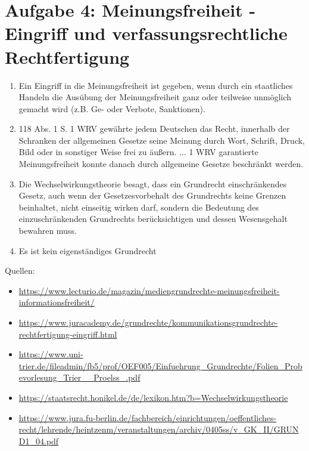 \documentclass{article}
\begin{document}
	\section*{Aufgabe 4: Meinungsfreiheit - Eingriff und verfassungsrechtliche Rechtfertigung}
	\begin{enumerate}[label=(\alph*)]
		\item Ein Eingriff in die Meinungsfreiheit ist gegeben, wenn durch ein staatliches Handeln die Ausübung der Meinungsfreiheit ganz oder teilweise unmöglich gemacht wird (z.B. Ge- oder Verbote, Sanktionen).
		\item 118 Abs. 1 S. 1 WRV gewährte jedem Deutschen das Recht, innerhalb der Schranken der allgemeinen Gesetze seine Meinung durch Wort, Schrift, Druck, Bild oder in sonstiger Weise frei zu äußern. ... 1 WRV garantierte Meinungsfreiheit konnte danach durch allgemeine Gesetze beschränkt werden.
		\item Die Wechselwirkungstheorie besagt, dass ein Grundrecht einschränkendes Gesetz, auch wenn der Gesetzesvorbehalt des Grundrechts keine Grenzen beinhaltet, nicht einseitig wirken darf, sondern die Bedeutung des einzuschränkenden Grundrechts berücksichtigen und dessen Wesensgehalt bewahren muss.
		\item Es ist kein eigenständiges Grundrecht
	\end{enumerate}

	Quellen:
	\begin{itemize}
		\item \url{https://www.lecturio.de/magazin/mediengrundrechte-meinungsfreiheit-informationsfreiheit/}
		\item \url{https://www.juracademy.de/grundrechte/kommunikationsgrundrechte-rechtfertigung-eingriff.html}
		\item \url{https://www.uni-trier.de/fileadmin/fb5/prof/OEF005/Einfuehrung_Grundrechte/Folien_Probevorlesung_Trier__Proelss_.pdf}
		\item \url{https://staatsrecht.honikel.de/de/lexikon.htm?b=Wechselwirkungstheorie}
		\item \url{https://www.jura.fu-berlin.de/fachbereich/einrichtungen/oeffentliches-recht/lehrende/heintzenm/veranstaltungen/archiv/0405ss/v_GK_II/GRUND1_04.pdf}
	\end{itemize}
\end{document}
